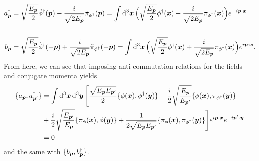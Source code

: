 {\begin{align}
    a_{\vb*{p}}^{\dagger} &= \sqrt{\frac{E_{\vb*{p}}}{2}} \tilde{\phi}^{\dagger}(\vb*{p}) - \frac{i}{\sqrt{2 E_{\vb*{p}}}} \tilde{\pi}_{\phi^{\dagger}}(\vb*{p}) = \int \dd[3]{\vb*{x}} \Big( \sqrt{\frac{E_{\vb*{p}}}{2}} \phi^{\dagger}(\vb*{x}) - \frac{i}{\sqrt{2 E_{\vb*{p}}}} \pi_{\phi^{\dagger}}(\vb*{x}) \Big) e^{-i \vb*{p} \cdot \vb*{x}} \nonumber \\ \nonumber \\
    b_{\vb*{p}} &= \sqrt{\frac{E_{\vb*{p}}}{2}} \tilde{\phi}^{\dagger}(-\vb*{p}) + \frac{i}{\sqrt{2 E_{\vb*{p}}}} \tilde{\pi}_{\phi^{\dagger}}(-\vb*{p}) = \int \dd[3]{\vb*{x}} \Big( \sqrt{\frac{E_{\vb*{p}}}{2}} \phi^{\dagger}(\vb*{x}) + \frac{i}{\sqrt{2 E_{\vb*{p}}}} \pi_{\phi^{\dagger}}(\vb*{x}) \Big) e^{i \vb*{p} \cdot \vb*{x}}
.\end{align}
From here, we can see that imposing anti-commutation relations for the fields and conjugate momenta yields
\begin{align}
    \{ a_{\vb*{p}}, a_{\vb*{p}'}^{\dagger} \} &= \int \dd[3]{\vb*{x}} \dd[3]{\vb*{y}} \Bigg[ \frac{\sqrt{E_{\vb*{p}} E_{\vb*{p}'}}}{2} \{ \phi(\vb*{x}), \phi^{\dagger}(\vb*{y}) \} - \frac{i}{2}\sqrt{\frac{E_{\vb*{p}}}{E_{\vb*{p}'}}} \{ \phi(\vb*{x}), \pi_{\phi^{\dagger}}(\vb*{y}) \} \nonumber \\
                                              &+ \frac{i}{2} \sqrt{\frac{E_{\vb*{p}'}}{E_{\vb*{p}}}} \{ \pi_{\phi}(\vb*{x}), \phi(\vb*{y}) \} + \frac{1}{2 \sqrt{E_{\vb*{p}} E_{\vb*{p}'}}} \{ \pi_{\phi}(\vb*{x}), \pi_{\phi^{\dagger}}(\vb*{y}) \} \Bigg] e^{i \vb*{p} \cdot \vb*{x}} e^{-i \vb*{p}' \cdot \vb*{y}} \nonumber \\
                                              &= 0
\end{align}
and the same with $\{ b_{\vb*{p}}, b_{\vb*{p}}^{\dagger} \}$.

}




